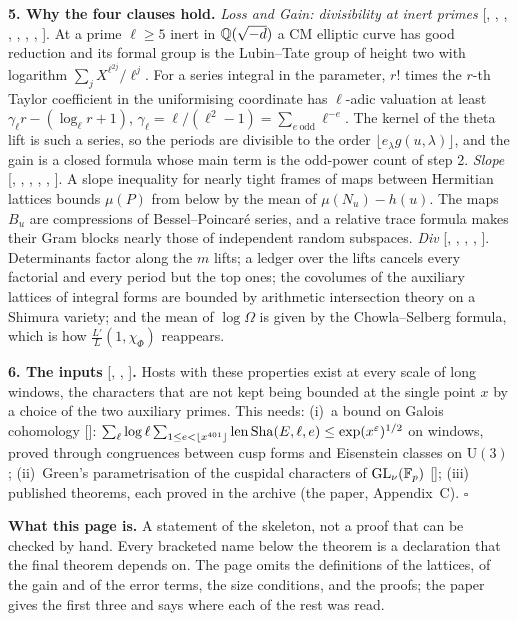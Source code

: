 \documentclass[10pt,a4paper]{article}
\newcommand{\GL}{\mathrm{GL}}\newcommand{\U}{\mathrm{U}}\newcommand{\Sha}{\mathrm{Sha}}
\newcommand{\eps}{\varepsilon}\newcommand{\abs}[1]{\lvert #1\rvert}
\newcommand{\step}[1]{\par\smallskip\noindent\textbf{#1}}
\begin{document}
\step{5. Why the four clauses hold.}
\emph{Loss and Gain: divisibility at inert primes} [, ,
, , , , ,
]. At a prime $\ell\ge5$ inert in
$\mathbb{Q}(\sqrt{-d})$ a CM elliptic curve has good reduction and its formal group is the Lubin--Tate
group of height two with logarithm $\sum_jX^{\ell^{2j}}/\ell^j$. For a series integral in the
parameter, $r!$ times the $r$-th Taylor coefficient in the uniformising coordinate has
$\ell$-adic valuation at least $\gamma_\ell r-(\log_\ell r+1)$,
$\gamma_\ell=\ell/(\ell^2-1)=\sum_{e\ \mathrm{odd}}\ell^{-e}$. The kernel of the theta lift is
such a series, so the periods are divisible to the order $\lfloor e_\lambda g(u,\lambda)\rfloor$,
and the gain is a closed formula whose main term is the odd-power count of step 2.
\emph{Slope} [, , , ,
, ]. A slope inequality for nearly tight frames of maps
between Hermitian lattices bounds $\mu(P)$ from below by the mean of $\mu(N_u)-h(u)$. The maps
$B_u$ are compressions of Bessel--Poincar\'e series, and a relative trace formula makes their
Gram blocks nearly those of independent random subspaces.
\emph{Div} [, , ,
, ]. Determinants factor along the $m$
lifts; a ledger over the lifts cancels every factorial and every period but the top ones; the
covolumes of the auxiliary lattices of integral forms are bounded by arithmetic intersection
theory on a Shimura variety; and the mean of $\log\Omega$ is given by the Chowla--Selberg
formula, which is how $\tfrac{L'}{L}(1,\chi_\Phi)$ reappears.

\step{6. The inputs} [, , ]\textbf{.}
Hosts with these properties exist at every scale of long windows, the characters that are not
kept being bounded at the single point $x$ by a choice of the two auxiliary primes. This needs:
(i)~a bound on Galois cohomology []:
$\sum_\ell\log\ell\sum_{1\le e<\lfloor x^{401}\rfloor}\len\Sha(E,\ell,e)\le\exp(x^\eps)^{1/2}$ on windows,
proved through congruences between cusp forms and Eisenstein classes on $\U(3)$;
(ii)~Green's parametrisation of the cuspidal characters of $\GL_\nu(\F_p)$ [];
(iii)~\rowspublished{} published theorems, each proved in the archive (the paper, Appendix~C). \hfill$\square$

\step{What this page is.} A statement of the skeleton, not a proof that can be checked by hand.
Every bracketed name below the theorem is a declaration that the final theorem depends on. The page
omits the definitions of the lattices, of the gain and of the error terms, the size conditions,
and the proofs; the paper gives the first three and says where each of the rest was read.
\end{document}
